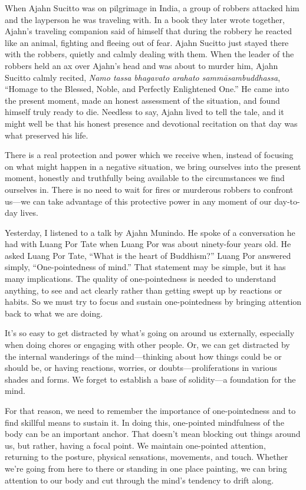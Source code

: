 When Ajahn Sucitto was on pilgrimage in India, a group of robbers 
attacked him and the layperson he was traveling with. In a book they 
later wrote together, Ajahn's traveling companion said of himself that 
during the robbery he reacted like an animal, fighting and fleeing out 
of fear. Ajahn Sucitto just stayed there with the robbers, quietly and 
calmly dealing with them. When the leader of the robbers held an ax 
over Ajahn's head and was about to murder him, Ajahn Sucitto calmly 
recited, \emph{Namo tassa bhagavato arahato sammāsambuddhassa}, 
``Homage to the Blessed, Noble, and Perfectly Enlightened One.'' He 
came into the present moment, made an honest assessment of the 
situation, and found himself truly ready to die. Needless to say, Ajahn 
lived to tell the tale, and it might well be that his honest presence 
and devotional recitation on that day was what preserved his life.

There is a real protection and power which we receive when, instead of 
focusing on what might happen in a negative situation, we bring 
ourselves into the present moment, honestly and truthfully being 
available to the circumstances we find ourselves in. There is no need 
to wait for fires or murderous robbers to confront us---we can take 
advantage of this protective power in any moment of our day-to-day 
lives.


Yesterday, I listened to a talk by Ajahn Munindo. He spoke of a 
conversation he had with Luang Por Tate when Luang Por was about 
ninety-four years old. He asked Luang Por Tate, ``What is the heart of 
Buddhism?'' Luang Por answered simply, ``One-pointedness of mind.'' 
That statement may be simple, but it has many implications. The quality 
of one-pointedness is needed to understand anything, to see and act 
clearly rather than getting swept up by reactions or habits. So we must 
try to focus and sustain one-pointedness by bringing attention back to 
what we are doing.

It's so easy to get distracted by what's going on around us externally, 
especially when doing chores or engaging with other people. Or, we can 
get distracted by the internal wanderings of the mind---thinking about 
how things could be or should be, or having reactions, worries, or 
doubts---proliferations in various shades and forms. We forget to 
establish a base of solidity---a foundation for the mind.

For that reason, we need to remember the importance of one-pointedness 
and to find skillful means to sustain it. In doing this, one-pointed 
mindfulness of the body can be an important anchor. That doesn't mean 
blocking out things around us, but rather, having a focal point. We 
maintain one-pointed attention, returning to the posture, physical 
sensations, movements, and touch. Whether we're going from here to 
there or standing in one place painting, we can bring attention to our 
body and cut through the mind's tendency to drift along.

